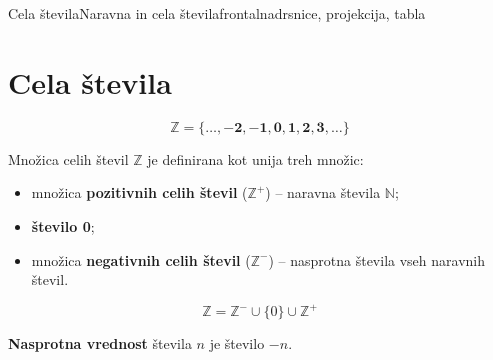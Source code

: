 \begin{priprava}{3}{}{Cela števila}{Naravna in cela števila}{frontalna}{drsnice, projekcija, tabla}


    \section{Cela števila}
         
    $$\mathbf{\mathbb{Z} = \{\ldots, -2, -1, 0, 1, 2, 3, \ldots\}}$$


 
    Množica celih števil $\mathbb{Z}$ je definirana kot unija treh množic:
        \begin{itemize}
            \item množica \textbf{pozitivnih celih števil} ($\mathbb{Z}^+$) -- naravna števila $\mathbb{N}$;
            \item \textbf{število 0};
            \item množica \textbf{negativnih celih števil} ($\mathbb{Z}^-$) -- nasprotna števila vseh naravnih števil.
        \end{itemize}
      $$\mathbb{Z} = \mathbb{Z}^- \cup \{0\} \cup \mathbb{Z}^+$$

 

 
    \textbf{Nasprotna vrednost} števila $n$ je število $-n$.
 

\end{priprava}